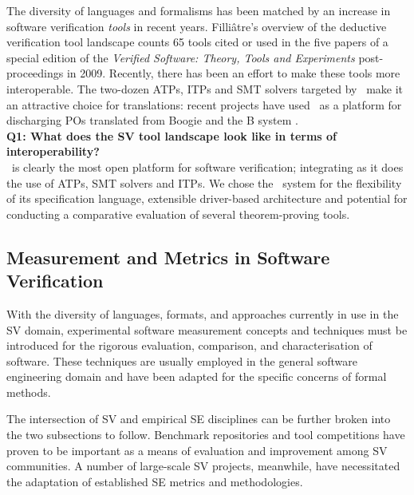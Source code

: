 The diversity of languages and formalisms has been matched by an increase in software verification \textit{tools} in recent years. 
Filli{\^a}tre's overview of the deductive verification tool landscape \cite{deductiveSV} counts 65 tools cited or used in the five papers of a special edition of the \textit{Verified Software: Theory, Tools and Experiments} post-proceedings in 2009. 
Recently, there has been an effort to make these tools more interoperable. 
The two-dozen ATPs, ITPs and SMT solvers targeted by \why~make it an attractive choice for translations: recent projects have used \why~as a platform for discharging POs translated from Boogie \cite{b2w} and the B system \cite{rodinplugin,atelierB2w}. \\

\textbf{Q1: What does the SV tool landscape look like in terms of interoperability?} \\
\why~is clearly the most open platform for software verification; integrating as it does the use of ATPs, SMT solvers and ITPs.
We chose the \why~system for the flexibility of its specification language, extensible driver-based architecture and potential for conducting a comparative evaluation of several theorem-proving tools.

\subsection{Measurement and Metrics in Software Verification}
\label{sub:lrsvmm}

With the diversity of languages, formats, and approaches currently in use in the SV domain, experimental software measurement concepts and techniques must be introduced for the rigorous evaluation, comparison, and characterisation of software. These techniques are usually employed in the general software engineering domain and have been adapted for the specific concerns of formal methods. 

The intersection of SV and empirical SE disciplines can be further broken into the two subsections to follow. 
Benchmark repositories and tool competitions have proven to be important as a means of evaluation and improvement among SV communities. A number of large-scale SV projects, meanwhile, have necessitated the adaptation of established SE metrics and methodologies.         
 
